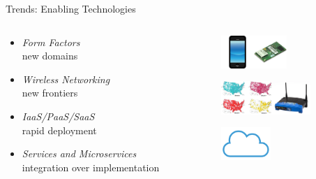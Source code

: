 \documentclass{beamer}
\begin{document}
\begin{frame}{Trends:  Enabling Technologies}
  \begin{columns}
    \begin{column}{.5\textwidth}
      \begin{itemize}
      \item \emph{Form Factors} \\ new domains
      \item \emph{Wireless Networking} \\ new frontiers
      \item \emph{IaaS/PaaS/SaaS} \\ rapid deployment
      \item \emph{Services and Microservices} \\ integration over implementation
      \end{itemize}
    \end{column}
    \begin{column}{.5\textwidth}
      \centering

      \includegraphics[width=1.25cm]{smartphone.jpg}\includegraphics[width=1.25cm]{embedded.jpg}

      \vspace*{12pt}

      \includegraphics[height=1.25cm]{cellmap.jpg}\includegraphics[height=1.25cm]{wirelessrouter.jpg}

      \vspace*{12pt}

      \includegraphics[height=1.25cm]{cloud.png}


\end{column}
\end{columns}
\end{frame}
\end{document}
